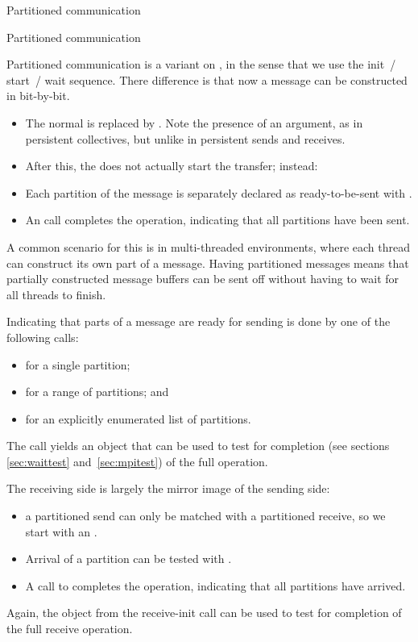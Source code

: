  {Partitioned communication}
\begin{mpifournote}{Partitioned communication}
\label{sec:psend}

Partitioned communication is a variant
on ,
in the sense that we use the init~/ start~/ wait sequence.
There difference is that now  a message can be constructed in bit-by-bit.
\begin{itemize}
\item The normal  is replaced
  by .
  Note the presence of an  argument,
  as in persistent collectives, but unlike in persistent sends and receives.
\item After this, the  does not
  actually start the transfer; instead:
\item Each partition of the message is separately
  declared as ready-to-be-sent with .
\item An  call completes the operation,
  indicating that all partitions have been sent.
\end{itemize}
A common scenario for this is in multi-threaded environments,
where each thread can construct its own part of a message.
Having partitioned messages means that partially constructed message buffers
can be sent off without having to wait for all threads to finish.

Indicating that parts of a message are ready for sending
is done by one of the following calls:
\begin{itemize}
\item {} for a single partition;
\item {} for a range of partitions; and
\item {} for an explicitly enumerated list of partitions.
\end{itemize}
The  call yields an  object
that can be used to test for completion
(see sections \ref{sec:waittest} and~\ref{sec:mpitest})
of the full operation.


The receiving side is largely the mirror image of the sending side:
%
%
\begin{itemize}
\item a partitioned send can only be matched with a partitioned receive,
  so we start with an . 
\item Arrival of a partition can be tested with .
\item A call to  completes the operation,
  indicating that all partitions have arrived.
\end{itemize}
Again, the  object from the receive-init call can
be used to test for completion of the full receive operation.


\end{mpifournote}
